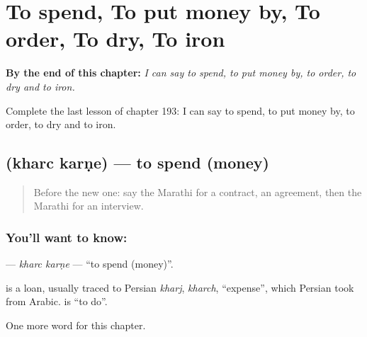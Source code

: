 
\chapter{To spend, To put money by, To order, To dry, To iron}
\label{ch:mr-to-spend-to-put-money-by-to-order-to-dry-to-iron}

\begin{chapteropening}
\textbf{By the end of this chapter:} \emph{I can say to spend, to put money by, to order, to dry and to iron.}

Complete the last lesson of chapter 193: I can say to spend, to put money by, to order, to dry and to iron.
\end{chapteropening}

\section[\texorpdfstring{\mr{खर्च} \mr{करणे} (kharc karṇe)}{खर्च करणे (kharc karṇe)}]{  (kharc karṇe) — to spend (money)}

\label{lesson:MR-C193-kharc-karne}



\begin{quote}
Before the new one: say the Marathi for a contract, an agreement, then the Marathi for an interview.
\end{quote}

\subsection*{You'll want to know:  }
\textbf{ } — \emph{kharc karṇe} — \textquotedblleft{}to spend (money)\textquotedblright{}.

\begin{cousinweb}
\textbf{} is a loan, usually traced to Persian \emph{kharj}, \emph{kharch}, \textquotedblleft{}expense\textquotedblright{}, which Persian took from Arabic. \textbf{} is \textquotedblleft{}to do\textquotedblright{}.
\end{cousinweb}

\begin{grammarlens}[title={What you've built}]
One more word for this chapter.
\end{grammarlens}

